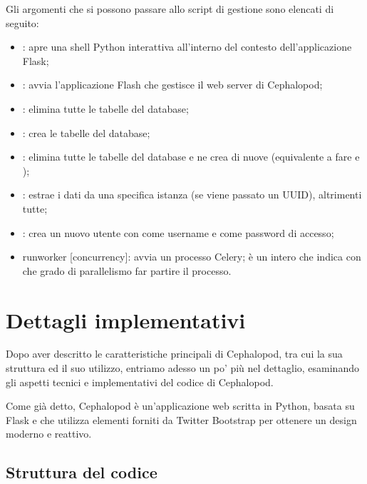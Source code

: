             Gli argomenti che si possono passare allo script di gestione sono elencati di seguito:
            
            \begin{itemize}
                \item {}: apre una shell Python interattiva all'interno del contesto dell'applicazione Flask;
                \item {}: avvia l'applicazione Flash che gestisce il web server di Cephalopod;
                \item {}: elimina tutte le tabelle del database;
                \item {}: crea le tabelle del database;
                \item {}: elimina tutte le tabelle del database e ne crea di nuove (equivalente a fare  e );
                \item {}: estrae i dati da una specifica istanza (se viene passato un \ac{UUID}), altrimenti tutte;
                \item {}: crea un nuovo utente con  come username e  come password di accesso;
                \item runworker [concurrency]: avvia un processo Celery;  è un intero che indica con che grado di parallelismo far partire il processo.
            \end{itemize}
    
    \section{Dettagli implementativi} \label{sec:it;dettagli_implementativi}
    
        Dopo aver descritto le caratteristiche principali di Cephalopod, tra cui la sua struttura ed il suo utilizzo, entriamo adesso un po' più nel dettaglio, esaminando gli aspetti tecnici e implementativi del codice di Cephalopod.
        
        Come già detto, Cephalopod è un'applicazione web scritta in Python, basata su Flask e che utilizza elementi  forniti da Twitter Bootstrap per ottenere un design moderno e reattivo.
        
        \subsection{Struttura del codice} \label{subsec:it;di;struttura_codice}
        
